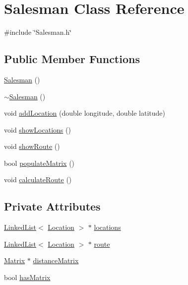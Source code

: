 \hypertarget{classSalesman}{\section{Salesman Class Reference}
\label{classSalesman}
}


{\ttfamily \#include \char`\"{}Salesman.\-h\char`\"{}}

\subsection*{Public Member Functions}
\begin{DoxyCompactItemize}
\item 
\hyperlink{classSalesman_ab32efbb2c7f7d57dbdcf9575370d1bce}{Salesman} ()
\item 
\hyperlink{classSalesman_af8e121d27b685f74edd1b8bc2964a668}{$\sim$\-Salesman} ()
\item 
void \hyperlink{classSalesman_a395e4d58d2c215370ec462fbf88d9db6}{add\-Location} (double longitude, double latitude)
\item 
void \hyperlink{classSalesman_adfdb2c81bbebdfa1415ff0955d63abdc}{show\-Locations} ()
\item 
void \hyperlink{classSalesman_a0d58b5de2bd9befcacd085fe930166ad}{show\-Route} ()
\item 
bool \hyperlink{classSalesman_a1590194b6a0e1edd9b7a156e00e5844e}{populate\-Matrix} ()
\item 
void \hyperlink{classSalesman_a4221f3823416c5a7b44cef13fce58700}{calculate\-Route} ()
\end{DoxyCompactItemize}
\subsection*{Private Attributes}
\begin{DoxyCompactItemize}
\item 
\hyperlink{classLinkedList}{Linked\-List}$<$ \hyperlink{classLocation}{Location} $>$ $\ast$ \hyperlink{classSalesman_ab9e104c49e0f5ac61deebb86520b229b}{locations}
\item 
\hyperlink{classLinkedList}{Linked\-List}$<$ \hyperlink{classLocation}{Location} $>$ $\ast$ \hyperlink{classSalesman_a7e6c1099741dd8cfc6d44784b026eb44}{route}
\item 
\hyperlink{classMatrix}{Matrix} $\ast$ \hyperlink{classSalesman_a11e52f4aa2750626800eecf2201c9088}{distance\-Matrix}
\item 
bool \hyperlink{classSalesman_abb3c72fd5efc1fb172d3271f82811053}{has\-Matrix}
\end{DoxyCompactItemize}



